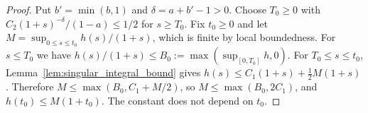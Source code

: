\begin{proof}
\leanok
Put $b' = \min(b, 1)$ and $\delta = a + b' - 1 > 0$. Choose $T_0 \ge 0$ with $C_2 (1 + s)^{-\delta}/(1-a) \le 1/2$ for $s \ge T_0$. Fix $t_0 \ge 0$ and let $M = \sup_{0 \le s \le t_0} h(s)/(1+s)$, which is finite by local boundedness. For $s \le T_0$ we have $h(s)/(1+s) \le B_0 := \max(\sup_{[0, T_0]} h, 0)$. For $T_0 \le s \le t_0$, Lemma~\ref{lem:singular_integral_bound} gives $h(s) \le C_1 (1 + s) + \tfrac12 M (1 + s)$. Therefore $M \le \max(B_0, C_1 + M/2)$, so $M \le \max(B_0, 2 C_1)$, and $h(t_0) \le M (1 + t_0)$. The constant does not depend on $t_0$.
\end{proof}

